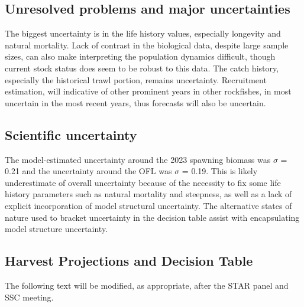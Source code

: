 \documentclass[11pt,
  letterpaper,
]{article}
\begin{document}


\clearpage

\hypertarget{unresolved-problems-and-major-uncertainties}{%
\subsection*{Unresolved problems and major uncertainties}\label{unresolved-problems-and-major-uncertainties}}

The biggest uncertainty is in the life history values, especially longevity and natural mortality. Lack of contrast in the biological data, despite large sample sizes, can also make interpreting the population dynamics difficult, though current stock status does seem to be robust to this data. The catch history, especially the historical trawl portion, remains uncertainty. Recruitment estimation, will indicative of other prominent years in other rockfishes, in most uncertain in the most recent years, thus forecasts will also be uncertain.

\hypertarget{scientific-uncertainty}{%
\subsection*{Scientific uncertainty}\label{scientific-uncertainty}}

The model-estimated uncertainty around the 2023 spawning biomass was \(\sigma\) = 0.21 and the uncertainty around the OFL was \(\sigma\) = 0.19. This is likely underestimate of overall uncertainty because of the necessity to fix some life history parameters such as natural mortality and steepness, as well as a lack of explicit incorporation of model structural uncertainty. The alternative states of nature used to bracket uncertainty in the decision table assist with encapsulating model structure uncertainty.

\hypertarget{harvest-projections-and-decision-table}{%
\subsection*{Harvest Projections and Decision Table}\label{harvest-projections-and-decision-table}}

The following text will be modified, as appropriate, after the STAR panel and SSC meeting.
\end{document}
